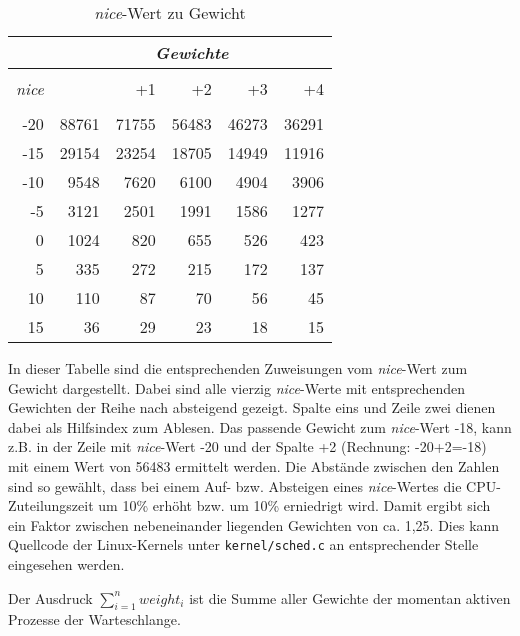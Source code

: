\begin {table}[h]
\begin{center}
\begin{tabular}{r|rrrrr}
 &	\multicolumn{5}{c}{\textit{Gewichte}} \\
	\hline\hline
	\\[\dimexpr-\normalbaselineskip+2pt]
	\textit{nice} & &+1	&	+2	& +3	& +4	\\
	\hline
    \\[\dimexpr-\normalbaselineskip+2pt]
	-20	&	88761	&	71755	&	56483	&	46273	&	36291	\\
	-15	&	29154 	&	23254 	&	18705 	&	14949 	&	11916	\\
	-10	&	9548	&	7620	&	6100	&	4904	&	3906	\\
	-5 	&	3121 	&	2501 	&	1991 	&	1586 	&	1277	\\
	0	&	1024 	&	820		&	655		&	526		&	423		\\
	5 	&	335 	&	272		& 	215		&	172		&	137		\\
	10	&	110		&	87 		&	70 		&	56 		&	45		\\
	15 	&	36 		&	29 		&	23 		&	18 		&	15	 	\\		
\end{tabular}
\caption {\textit{nice}-Wert zu Gewicht} \label{tab:nice2weight} 
\end{center}
\end{table}


In dieser Tabelle sind die entsprechenden Zuweisungen vom \textit{nice}-Wert zum Gewicht dargestellt. 
Dabei sind alle vierzig \textit{nice}-Werte mit entsprechenden Gewichten der Reihe nach absteigend gezeigt.
Spalte eins und Zeile zwei dienen dabei als Hilfsindex zum Ablesen. Das passende Gewicht zum \textit{nice}-Wert -18, kann z.B. in der Zeile mit \textit{nice}-Wert -20 und der Spalte +2 (Rechnung: -20+2=-18) mit einem Wert von 56483 ermittelt werden.
Die Abstände zwischen den Zahlen sind so gewählt, dass bei einem Auf- bzw. Absteigen eines \textit{nice}-Wertes die CPU-Zuteilungszeit um 10\% erhöht bzw. um 10\% erniedrigt wird. Damit ergibt sich ein Faktor zwischen nebeneinander liegenden Gewichten von ca. 1,25. Dies kann Quellcode der Linux-Kernels unter \texttt{kernel/sched.c} an entsprechender Stelle eingesehen werden. 

Der Ausdruck \textit{$\sum_{i=1}^{n} weight_{i}$} ist die Summe aller Gewichte der momentan aktiven Prozesse der Warte\-schlan\-ge.

